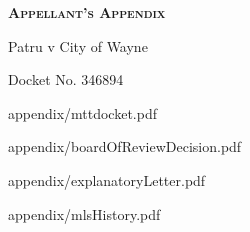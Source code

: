\documentclass[12pt,\documentclassflag]{article}
\begin{document}

\begin{centering}
  \bf\scshape Appellant's Appendix\par%
  \rm Patru v City of Wayne\par%
  Docket No. 346894\par%
\end{centering}

\tableofcontents
\newpage
\renewcommand{\footrulewidth}{0.4pt}

\newcommand{\addLabelsToAllIncludedPages}[1]{%
   \refstepcounter{includepdfpage}%
   \stepcounter{currentpagecounter}%
   \label{#1.\thecurrentpagecounter}}%

\newcommand{\myincludepdf}[2]{%
  \setcounter{currentpagecounter}{0}%
  {appendix/#1.pdf}}%
  
\renewcommand{\sectionmark}[1]{\markboth{#1}{}}%
\myincludepdf{mttdocket}{1,section, 1, Tax Tribunal Docket}

\renewcommand{\sectionmark}[1]{\markboth{Board of Review Decision}{}}%
\myincludepdf{boardOfReviewDecision}{1,section,1,Board of Review Decision (docket line 2)}%


\myincludepdf{explanatoryLetter}{1,section,1,Appellant's Evidence,evidence,1,subsection,2,Explanatory Letter (docket line 38)}%

%
\myincludepdf{mlsHistory}{1,subsection,2,MLS History (docket line 33)}%
\end{document}
